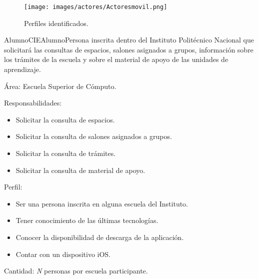     \begin{figure}[h!]
	\begin{center}
		\texttt{[image: images/actores/Actoresmovil.png]}
		\caption{Perfiles identificados.}
		\label{fig:perfilesMovil}
	\end{center}
\end{figure}
    \begin{actor}{Alumno}{CIEAlumno}{Persona inscrita dentro del Instituto Politécnico Nacional que solicitará las consultas de espacios, salones asignados a grupos, información sobre los trámites de la escuela y sobre el material de apoyo de las unidades de aprendizaje.}

	\item[Área:] Escuela Superior de Cómputo.

	\item[Responsabilidades:] \hspace{1pt}
	
		\begin{itemize}

		    \item Solicitar la consulta de espacios.
		    \item Solicitar la consulta de salones asignados a grupos.
		    \item Solicitar la consulta de trámites.
		    \item Solicitar la consulta de material de apoyo.
		\end{itemize}


	\item[Perfil:] \hspace{1pt}
		\begin{itemize}
		    \item Ser una persona inscrita en alguna escuela del Instituto.
		    \item Tener conocimiento de las últimas tecnologías.
		    \item Conocer la disponibilidad de descarga de la aplicación.
		    \item Contar con un dispositivo iOS.
	    \end{itemize}

	\item[Cantidad:] \textit{N} personas por escuela participante.

\end{actor}


